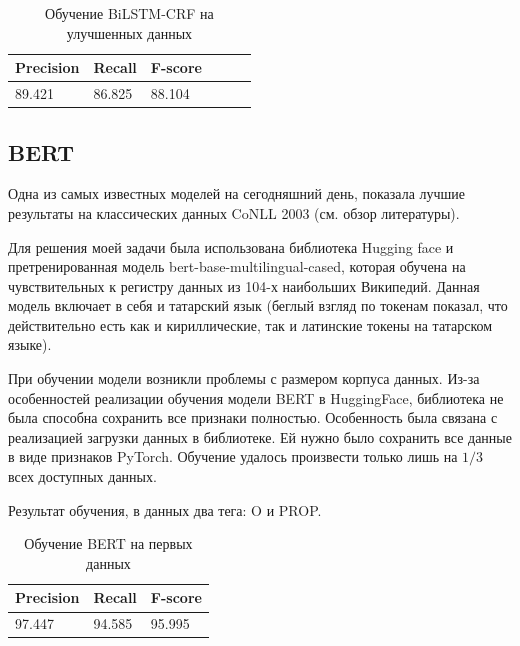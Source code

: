 \begin{table}[h]
\begin{tabular}{| l | l | l | l | l | l |}
\hline
Precision  &   Recall   &  F-score   \\

\hline
                89.421     & 86.825     & 88.104          \\
\hline
\end{tabular}
\caption{Обучение BiLSTM-CRF на улучшенных данных}
\end{table}
\vspace{1cm}
\subsection{BERT}

\cite{DBLP:journals/corr/abs-1810-04805} Одна из самых известных моделей на сегодняшний день, показала лучшие результаты на классических данных CoNLL 2003 (см. обзор литературы).

Для решения моей задачи была использована библиотека Hugging face \cite{Wolf2019HuggingFacesTS} и претренированная модель bert-base-multilingual-cased, которая обучена на чувствительных к регистру данных из 104-х наибольших Википедий. Данная модель включает в себя и татарский язык (беглый взгляд по токенам показал, что действительно есть как и кириллические, так и латинские токены на татарском языке). 

При обучении модели возникли проблемы с размером корпуса данных. Из-за особенностей реализации обучения модели BERT в HuggingFace, библиотека не была способна сохранить все признаки полностью. Особенность была связана с реализацией загрузки данных в библиотеке. Ей нужно было сохранить все данные в виде признаков PyTorch. Обучение удалось произвести только лишь на $1/3$ всех доступных данных.

Результат обучения, в данных два тега: O и PROP.

\vspace{1cm}
\begin{table}[h]
\begin{tabular}{| l | l | l |}
\hline
Precision  &   Recall   &  F-score     \\

\hline
97.447     & 94.585    & 95.995        \\
\hline
\end{tabular}
\caption{Обучение BERT на первых данных}
\end{table}

